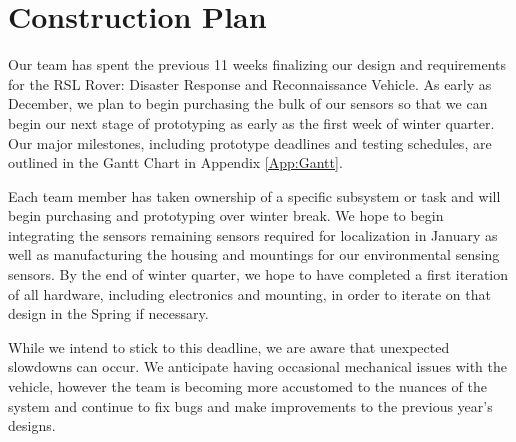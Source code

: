 \chapter{Construction Plan}

Our team has spent the previous 11 weeks finalizing our design and requirements for the RSL Rover: Disaster Response and Reconnaissance Vehicle. As early as December, we plan to begin purchasing the bulk of our sensors so that we can begin our next stage of prototyping as early as the first week of winter quarter. Our major milestones, including prototype deadlines and testing schedules, are outlined in the Gantt Chart in Appendix \ref{App:Gantt}. 

Each team member has taken ownership of a specific subsystem or task and will begin purchasing and prototyping over winter break. We hope to begin integrating the sensors remaining sensors required for localization in January as well as manufacturing the housing and mountings for our environmental sensing sensors. By the end of winter quarter, we hope to have completed a first iteration of all hardware, including electronics and mounting, in order to iterate on that design in the Spring if necessary. 

While we intend to stick to this deadline, we are aware that unexpected slowdowns can occur. We anticipate having occasional mechanical issues with the vehicle, however the team is becoming more accustomed to the nuances of the system and continue to fix bugs and make improvements to the previous year's designs. 

